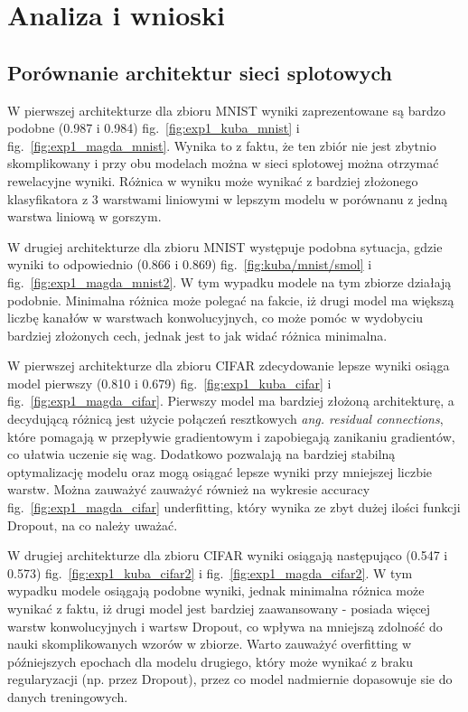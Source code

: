 \documentclass[10pt]{article}
\begin{document}
\pagebreak
\section{Analiza i wnioski}\label{sec:wyniki}
\subsection*{Porównanie architektur sieci splotowych}
W pierwszej architekturze dla zbioru MNIST wyniki zaprezentowane są bardzo podobne (0.987 i 0.984) fig.~\ref{fig:exp1_kuba_mnist} i fig.~\ref{fig:exp1_magda_mnist}.
Wynika to z faktu, że ten zbiór nie jest zbytnio skomplikowany i przy obu modelach można w sieci splotowej można otrzymać rewelacyjne wyniki.
Różnica w wyniku może wynikać z bardziej złożonego klasyfikatora z 3 warstwami liniowymi w lepszym modelu w porównanu z jedną warstwa liniową w gorszym.

W drugiej architekturze dla zbioru MNIST występuje podobna sytuacja, gdzie wyniki to odpowiednio (0.866 i 0.869) fig.~\ref{fig:kuba/mnist/smol} i fig.~\ref{fig:exp1_magda_mnist2}.
W tym wypadku modele na tym zbiorze działają podobnie.
Minimalna różnica może polegać na fakcie, iż drugi model ma większą liczbę kanałów w warstwach konwolucyjnych, co może pomóc w wydobyciu bardziej złożonych cech, jednak jest to jak widać różnica minimalna.

W pierwszej architekturze dla zbioru CIFAR zdecydowanie lepsze wyniki osiąga model pierwszy (0.810 i 0.679) fig.~\ref{fig:exp1_kuba_cifar} i fig.~\ref{fig:exp1_magda_cifar}.
Pierwszy model ma bardziej złożoną architekturę, a decydującą różnicą jest użycie połączeń resztkowych \textit{ang. \textquotedbl{}residual connections\textquotedbl{}}, które pomagają w przepływie gradientowym i zapobiegają zanikaniu gradientów, co ułatwia uczenie się wag.
Dodatkowo pozwalają na bardziej stabilną optymalizację modelu oraz mogą osiągać lepsze wyniki przy mniejszej liczbie warstw.
Można zauważyć zauważyć również na wykresie accuracy fig.~\ref{fig:exp1_magda_cifar} underfitting, który wynika ze zbyt dużej ilości funkcji Dropout, na co należy uważać.


W drugiej architekturze dla zbioru CIFAR wyniki osiągają następująco (0.547 i 0.573) fig.~\ref{fig:exp1_kuba_cifar2} i fig.~\ref{fig:exp1_magda_cifar2}.
W tym wypadku modele osiągają podobne wyniki, jednak minimalna różnica może wynikać z faktu, iż drugi model jest bardziej zaawansowany - posiada więcej warstw konwolucyjnych i wartsw Dropout, co wpływa na mniejszą zdolność do nauki skomplikowanych wzorów w zbiorze.
Warto zauważyć overfitting w późniejszych epochach dla modelu drugiego, który może wynikać z braku regularyzacji (np.
przez Dropout), przez co model nadmiernie dopasowuje sie do danych treningowych.
\end{document}
